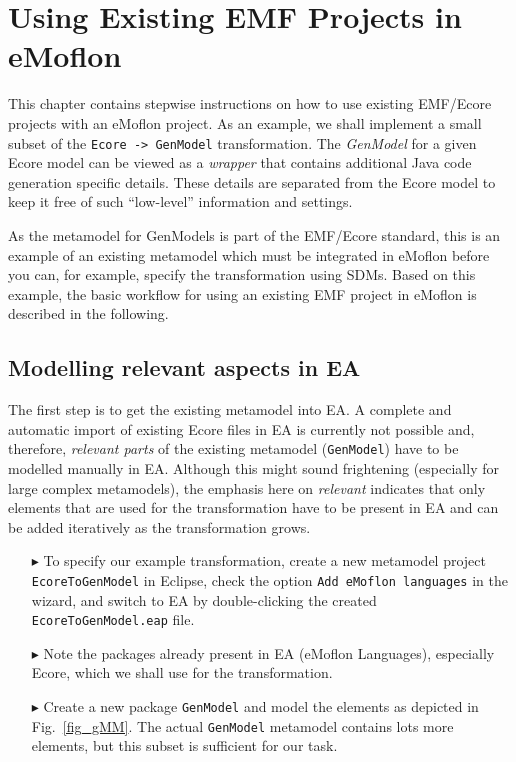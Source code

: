 \section{Using Existing EMF Projects in eMoflon}
\label{sec : Ecore2GenModel}
\visHeader

This chapter contains stepwise instructions on how to use existing \mbox{EMF}/\-Ecore projects with an eMoflon project.  As an example, we shall implement a
small subset of the \texttt{Ecore -> GenModel} transformation. The \emph{GenModel} for a given Ecore model can be viewed as a \emph{wrapper} that contains
additional Java code generation specific details. These details are separated from the Ecore model to keep it free of such ``low-level'' information and
settings.

As the metamodel for \textsf{GenModels} is part of the EMF/Ecore standard, this is an example of an existing metamodel which must be integrated in eMoflon
before you can, for example, specify the transformation using SDMs.
Based on this example, the basic workflow for using an existing EMF project in eMoflon is described in the following.



\subsection{Modelling relevant aspects in EA}
\label{sec: Set Up the Example}

The first step is to get the existing metamodel into EA. A complete and automatic import of existing Ecore files in EA is currently not possible and, therefore,
\emph{relevant parts} of the existing metamodel (\texttt{GenModel}) have to be modelled manually in EA.
Although this might sound frightening (especially for large complex metamodels), the emphasis here on \emph{relevant} indicates that only elements that are used
for the transformation have to be present in EA and can be added iteratively as the transformation grows.

\begin{enumerate}
\item[$\blacktriangleright$] To specify our example transformation, create a new metamodel project \texttt{EcoreToGenModel} in Eclipse, check the option
\texttt{Add eMoflon languages} in the wizard, and switch to EA by double-clicking the created \texttt{Ecore\-To\-Gen\-Model.eap} file.

\item[$\blacktriangleright$] Note the packages already present in EA (eMoflon Languages), especially \textsf{Ecore}, which we shall use for the transformation.

\item[$\blacktriangleright$] Create a new package \texttt{GenModel} and model the elements as depicted in Fig.~\ref{fig_gMM}.
The actual \texttt{GenModel} metamodel contains lots more elements, but this subset is sufficient for our task.
\end{enumerate}

